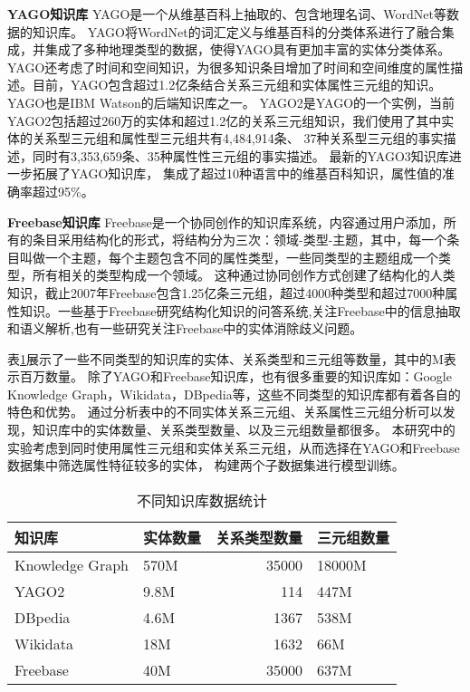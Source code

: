 \textbf{YAGO知识库} YAGO是一个从维基百科上抽取的、包含地理名词、WordNet\cite{Kasneci2008TheYA}等数据的知识库。
YAGO将WordNet的词汇定义与维基百科的分类体系进行了融合集成\cite{Suchanek2008YAGOAL}，并集成了多种地理类型的数据，使得YAGO具有更加丰富的实体分类体系。YAGO还考虑了时间和空间知识\cite{Hoffart2011YAGO2EA}，为很多知识条目增加了时间和空间维度的属性描述。目前，YAGO包含超过1.2亿条结合关系三元组和实体属性三元组的知识。YAGO也是IBM Watson\cite{Ferrucci2010BuildingWA}的后端知识库之一。
YAGO2\cite{Hoffart2013YAGO2AS}是YAGO的一个实例，当前YAGO2包括超过260万的实体和超过1.2亿的关系三元组知识，我们使用了其中实体的关系型三元组和属性型三元组共有4,484,914条、
37种关系型三元组的事实描述，同时有3,353,659条、35种属性性三元组的事实描述。
最新的YAGO3知识库\cite{Mahdisoltani2015YAGO3AK}进一步拓展了YAGO知识库，
集成了超过10种语言中的维基百科知识，属性值的准确率超过95\%。

\textbf{Freebase知识库} Freebase\cite{Bollacker2008FreebaseAC}是一个协同创作的知识库系统，内容通过用户添加，所有的条目采用结构化的形式，将结构分为三次：领域-类型-主题，其中，每一个条目叫做一个主题，每个主题包含不同的属性类型，一些同类型的主题组成一个类型，所有相关的类型构成一个领域。
这种通过协同创作方式创建了结构化的人类知识，截止2007年Freebase包含1.25亿条三元组，超过4000种类型和超过7000种属性知识。一些基于Freebase研究结构化知识的问答系统\cite{Yao2014InformationEO}\cite{Yao2015LeanQA},关注Freebase中的信息抽取和语义解析\cite{Yao2014FreebaseQI},也有一些研究关注Freebase中的实体消除歧义问题\cite{Zheng2012EntityDW}。

表\ref{tab:addlabel-kb-list}展示了一些不同类型的知识库的实体、关系类型和三元组等数量，其中的M表示百万数量。
除了YAGO和Freebase知识库，也有很多重要的知识库如：Google Knowledge Graph，Wikidata，DBpedia等，这些不同类型的知识库都有着各自的特色和优势。
通过分析表中的不同实体关系三元组、关系属性三元组分析可以发现，知识库中的实体数量、关系类型数量、以及三元组数量都很多。
本研究中的实验考虑到同时使用属性三元组和实体关系三元组，从而选择在YAGO和Freebase数据集中筛选属性特征较多的实体，
构建两个子数据集进行模型训练。

\begin{table}[htbp]
  \centering
  \caption{不同知识库数据统计}
    \begin{tabular}{|l|l|r|l|}
    \hline
    知识库   & 实体数量  & \multicolumn{1}{l|}{关系类型数量} & 三元组数量 \\
    \hline
    Knowledge Graph & 570M  & 35000 & 18000M \\
    \hline
    YAGO2 & 9.8M  & 114   & 447M \\
    \hline
    DBpedia & 4.6M  & 1367  & 538M \\
    \hline
    Wikidata & 18M   & 1632  & 66M \\
    \hline
    Freebase & 40M   & 35000 & 637M \\
    \hline
    \end{tabular}%
  \label{tab:addlabel-kb-list}%
\end{table}%


